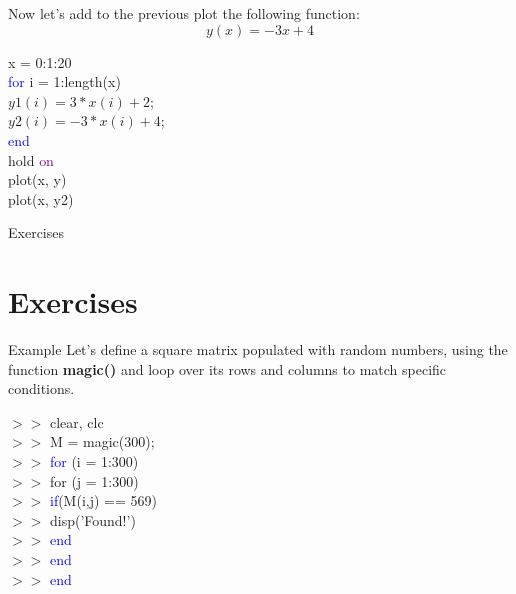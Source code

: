 \documentclass[xcolor={dvipsnames,rgb}, aspectratio=169]{beamer}
\begin{document}
\begin{frame}{}
    Now let's add to the previous plot the following function:
    \begin{equation*}
        y(x) = -3x + 4
    \end{equation*}

    \begin{tcolorbox}[colback=white,colframe=bluepoli]
        x = 0:1:20\\
        \textcolor{blue}{for} i = 1:length(x)\\
        $y1(i) = 3 * x(i) + 2$; \\
        $y2(i) = -3 * x(i) + 4$; \\
        \textcolor{blue}{end}\\
        hold \textcolor{purple}{on}\\
        plot(x, y) \\
        plot(x, y2)
    \end{tcolorbox}
\end{frame}

{%
\begin{frame}[standout]
    Exercises
\end{frame}
}
\section{Exercises}
\begin{frame}{Example}
    Let's define a square matrix populated with random numbers, using the function
    \textbf{magic()} and loop over its rows and columns to match specific conditions.

    \begin{tcolorbox}[colback=white,colframe=bluepoli]
        $>>$ clear, clc \\
        $>>$ M = magic(300);\\
        $>>$ \textcolor{blue}{for} (i = 1:300)\\
        $>>$ \hspace{1em}\color{blue} for \color{black} (j = 1:300)\\
        $>>$ \hspace{1em}\hspace{1em}\textcolor{blue}{if}(M(i,j) == 569)\\
        $>>$ \hspace{1em}\hspace{1em}\hspace{1em}disp('Found!')\\
        $>>$ \hspace{1em}\hspace{1em}\textcolor{blue}{end}\\
        $>>$ \hspace{1em}\textcolor{blue}{end}\\
        $>>$ \textcolor{blue}{end}
    \end{tcolorbox}
\end{frame}
\end{document}
